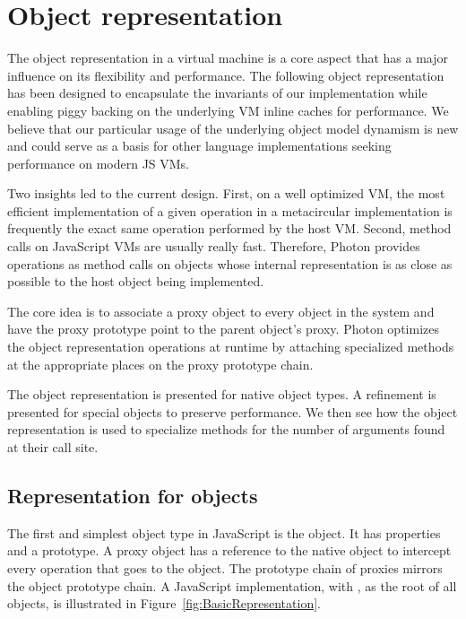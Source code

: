 \section{Object representation}
\label{sec:ObjectRepresentation}

The object representation in a virtual machine is a core aspect that has a
major influence on its flexibility and performance. The following object
representation has been designed to encapsulate the invariants of our
implementation while enabling piggy backing on the underlying VM inline caches
for performance. We believe that our particular usage of the underlying object
model dynamism is new and could serve as a basis for other language
implementations seeking performance on modern JS VMs.

Two insights led to the current design. First, on a well optimized VM, the most
efficient implementation of a given operation in a metacircular implementation
is frequently the exact same operation performed by the host VM. Second, method
calls on JavaScript VMs are usually really fast. Therefore, Photon provides
operations as method calls on objects whose internal representation is as close
as possible to the host object being implemented. 

The core idea is to associate a proxy object to every object in the system and
have the proxy prototype point to the parent object's proxy. Photon optimizes
the object representation operations at runtime by attaching specialized
methods at the appropriate places on the proxy prototype chain.

The object representation is presented for native object types. A refinement is
presented for special objects to preserve performance. We then see how the
object representation is used to specialize methods for the number of arguments
found at their call site. 

\subsection{Representation for objects}

The first and simplest object type in JavaScript is the object. It has
properties and a prototype. A proxy object has a reference to the native object
to intercept every operation that goes to the object. The prototype chain of
proxies mirrors the object prototype chain. A JavaScript implementation, with
, as the root of all objects, is illustrated in
Figure~\ref{fig:BasicRepresentation}.

